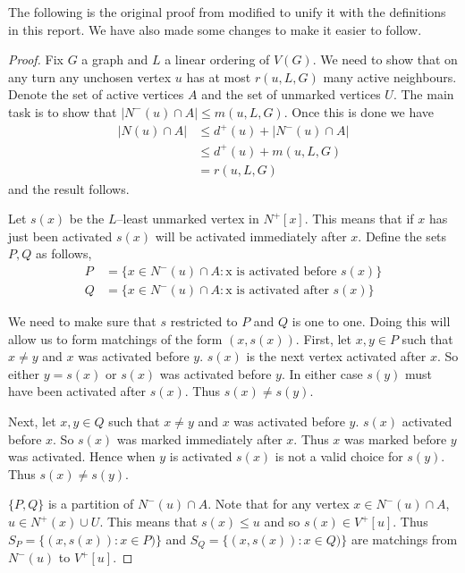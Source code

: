 The following is the original proof from \cite{KIERSTEAD2000} modified to unify it with the definitions in this report. We have also made some changes to make it easier to follow.

\begin{proof}
    Fix $G$ a graph and $L$ a linear ordering of $V(G)$. We need to show that on any turn any unchosen vertex $u$ has at most $r(u,L,G)$ many active neighbours. Denote the set of active vertices $A$ and the set of unmarked vertices $U$. The main task is to show that $|N^-(u)\cap A|\leq m(u,L,G)$. Once this is done we have 
    \begin{align*}
        |N(u)\cap A| &\leq d^+(u) + |N^-(u)\cap A| \\
        & \leq  d^+(u) + m(u,L,G) \\
        & = r(u,L,G)
    \end{align*} 
    and the result follows.
    
    Let $s(x)$ be the $L$--least unmarked vertex in $N^+[x]$. This means that if $x$ has just been activated $s(x)$ will be activated immediately after $x$. Define the sets $P,Q$ as follows,
    \begin{align*}
        P&=\{x\in N^-(u)\cap A : \text{x is activated before $s(x)$}\} \\        
        Q&=\{x\in N^-(u)\cap A : \text{x is activated after $s(x)$}\}
    \end{align*}
    
    We need to make sure that $s$ restricted to $P$ and $Q$ is one to one. Doing this will allow us to form matchings of the form $(x,s(x))$. First, let $x,y\in P$ such that $x\neq y$ and $x$ was activated before $y$. $s(x)$ is the next vertex activated after $x$. So either $y = s(x)$ or $s(x)$ was activated before $y$. In either case $s(y)$ must have been activated after $s(x)$. Thus $s(x)\neq s(y)$.
    
    Next, let $x,y\in Q$ such that $x\neq y$ and $x$ was activated before $y$. $s(x)$ activated before $x$. So $s(x)$ was marked immediately after $x$. Thus $x$ was marked before $y$ was activated. Hence when $y$ is activated $s(x)$ is not a valid choice for $s(y)$. Thus $s(x)\neq s(y)$.
    
    $\{P,Q\}$ is a partition of $N^-(u)\cap A$. Note that for any vertex $x\in N^-(u)\cap A$, $u\in N^+(x)\cup U$. This means that $s(x)\leq u$ and so $s(x)\in V^+[u]$. Thus $S_P = \{(x,s(x)):x\in P)\}$ and $S_Q = \{(x,s(x)):x\in Q)\}$ are matchings from $N^-(u)$ to $V^+[u]$.
    

\end{proof}
